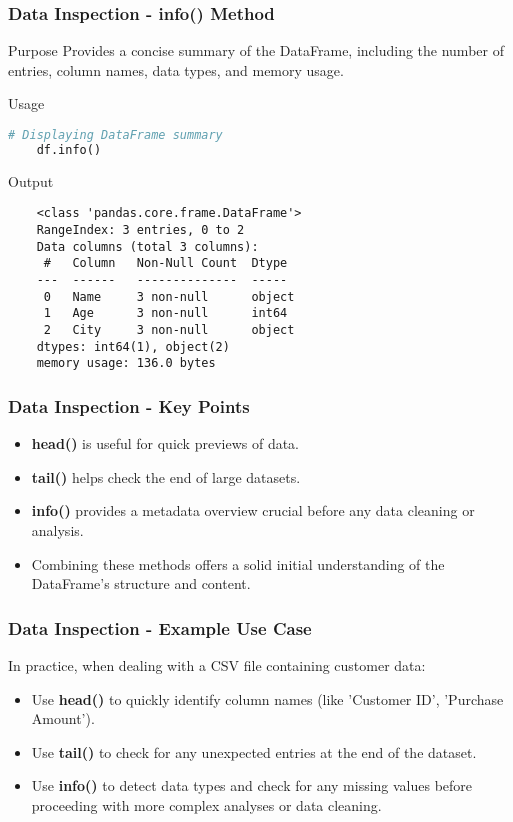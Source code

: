 \documentclass[aspectratio=169]{beamer}
\begin{document}
\begin{frame}[fragile]
    \frametitle{Data Inspection - info() Method}
    \begin{block}{Purpose}
        Provides a concise summary of the DataFrame, including the number of entries, column names, data types, and memory usage.
    \end{block}
    \begin{block}{Usage}
    \begin{lstlisting}[language=python]
    # Displaying DataFrame summary
    df.info()
    \end{lstlisting}
    \end{block}
    \begin{block}{Output}
    \begin{verbatim}
    <class 'pandas.core.frame.DataFrame'>
    RangeIndex: 3 entries, 0 to 2
    Data columns (total 3 columns):
     #   Column   Non-Null Count  Dtype 
    ---  ------   --------------  ----- 
     0   Name     3 non-null      object
     1   Age      3 non-null      int64 
     2   City     3 non-null      object
    dtypes: int64(1), object(2)
    memory usage: 136.0 bytes
    \end{verbatim}
    \end{block}
\end{frame}

\begin{frame}[fragile]
    \frametitle{Data Inspection - Key Points}
    \begin{itemize}
        \item \textbf{head()} is useful for quick previews of data.
        \item \textbf{tail()} helps check the end of large datasets.
        \item \textbf{info()} provides a metadata overview crucial before any data cleaning or analysis.
        \item Combining these methods offers a solid initial understanding of the DataFrame’s structure and content.
    \end{itemize}
\end{frame}

\begin{frame}[fragile]
    \frametitle{Data Inspection - Example Use Case}
    In practice, when dealing with a CSV file containing customer data:
    \begin{itemize}
        \item Use \textbf{head()} to quickly identify column names (like 'Customer ID', 'Purchase Amount').
        \item Use \textbf{tail()} to check for any unexpected entries at the end of the dataset.
        \item Use \textbf{info()} to detect data types and check for any missing values before proceeding with more complex analyses or data cleaning.
    \end{itemize}
\end{frame}
\end{document}
